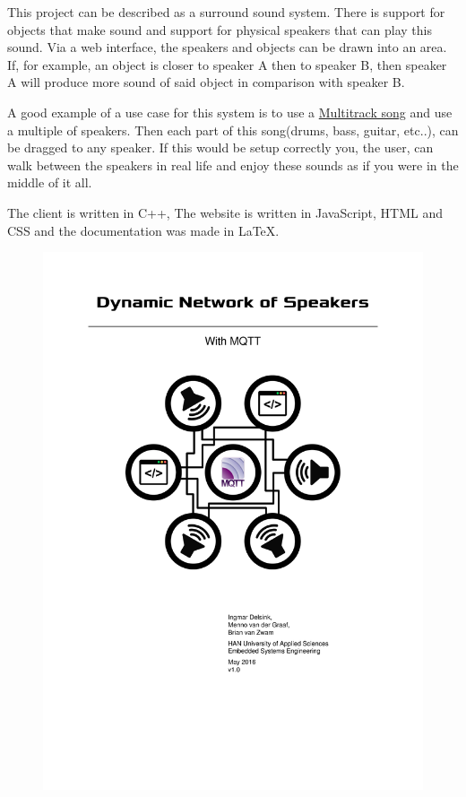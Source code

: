 This project can be described as a surround sound system.
There is support for objects that make sound and support for physical speakers that can play this sound.
Via a web interface, the speakers and objects can be drawn into an area.
If, for example, an object is closer to speaker A then to speaker B,
then speaker A will produce more sound of said object in comparison with speaker B.

A good example of a use case for this system is to use a \href{https://en.wikipedia.org/wiki/Multitrack_recording}{Multitrack song} and use a multiple of speakers.
Then each part of this song(drums, bass, guitar, etc..), can be dragged to any speaker.
If this would be setup correctly you, the user,
can walk between the speakers in real life and enjoy these sounds as if you were in the middle of it all.


The client is written in C++, The website is written in JavaScript, HTML and CSS and the documentation was made in \LaTeX.

\vspace{15ex}

\begin{figure}[H]
    \centering
    \includegraphics[height=.2\paperheight]{dynamic_network_of_speakers}
\end{figure}
